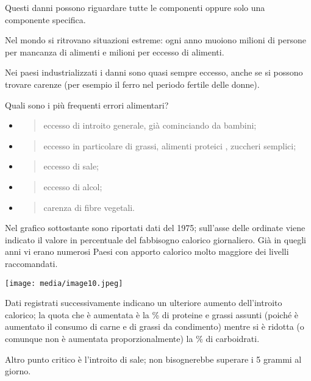 \documentclass[]{article}
\begin{document}
Questi danni possono riguardare tutte le componenti oppure solo una
componente specifica.

Nel mondo si ritrovano situazioni estreme: ogni anno muoiono milioni di
persone per mancanza di alimenti e milioni per eccesso di alimenti.

Nei paesi industrializzati i danni sono quasi sempre eccesso, anche se
si possono trovare carenze (per esempio il ferro nel periodo fertile
delle donne).

Quali sono i più frequenti errori alimentari?

\begin{itemize}
\item
  \begin{quote}
  eccesso di introito generale, già cominciando da bambini;
  \end{quote}
\item
  \begin{quote}
  eccesso in particolare di grassi, alimenti proteici , zuccheri
  semplici;
  \end{quote}
\item
  \begin{quote}
  eccesso di sale;
  \end{quote}
\item
  \begin{quote}
  eccesso di alcol;
  \end{quote}
\item
  \begin{quote}
  carenza di fibre vegetali.
  \end{quote}
\end{itemize}

Nel grafico sottostante sono riportati dati del 1975; sull'asse delle
ordinate viene indicato il valore in percentuale del fabbisogno calorico
giornaliero. Già in quegli anni vi erano numerosi Paesi con apporto
calorico molto maggiore dei livelli raccomandati.

\texttt{[image: media/image10.jpeg]}

Dati registrati successivamente indicano un ulteriore aumento
dell'introito calorico; la quota che è aumentata è la \% di proteine e
grassi assunti (poiché è aumentato il consumo di carne e di grassi da
condimento) mentre si è ridotta (o comunque non è aumentata
proporzionalmente) la \% di carboidrati.

Altro punto critico è l'introito di sale; non bisognerebbe superare i 5
grammi al giorno.
\end{document}
